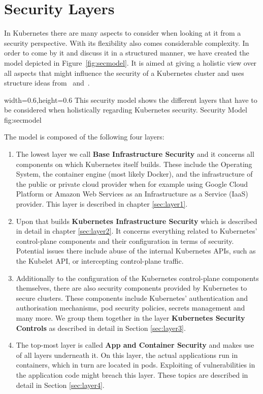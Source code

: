 \chapter{Security Layers}

In Kubernetes there are many aspects to consider when looking at it from a security perspective. With its flexibility also comes considerable complexity. In order to come by it and discuss it in a structured manner, we have created the model depicted in Figure~\ref{fig:secmodel}. It is aimed at giving a holistic view over all aspects that might influence the security of a Kubernetes cluster and uses structure ideas from~\textcite{securingkubernetes} and~\textcite{kubernetessecurity}.

  {width=0.6\textwidth,height=0.6\textheight}%
  {This security model shows the different layers that have to be considered when holistically regarding Kubernetes security.}%
  {Security Model}%
  {fig:secmodel}%

The model is composed of the following four layers:

\begin{enumerate}
    \item The lowest layer we call \textbf{Base Infrastructure Security} and it concerns all components on which Kubernetes itself builds. These include the Operating System, the container engine (most likely Docker), and the infrastructure of the public or private cloud provider when for example using Google Cloud Platform or Amazon Web Services as an Infrastructure as a Service (IaaS) provider. This layer is described in chapter \ref{sec:layer1}.
    \item Upon that builds \textbf{Kubernetes Infrastructure Security} which is described in detail in chapter \ref{sec:layer2}. It concerns everything related to Kubernetes' control-plane components and their configuration in terms of security. Potential issues there include abuse of the internal Kubernetes APIs, such as the Kubelet API, or intercepting control-plane traffic.
    \item Additionally to the configuration of the Kubernetes control-plane components themselves, there are also security components provided by Kubernetes to secure clusters. These components include Kubernetes' authentication and authorisation mechanisms, pod security policies, secrets management and many more. We group them together in the layer \textbf{Kubernetes Security Controls} as described in detail in Section \ref{sec:layer3}.
    \item The top-most layer is called \textbf{App and Container Security} and makes use of all layers underneath it. On this layer, the actual applications run in containers, which in turn are located in pods. Exploiting of vulnerabilities in the application code might breach this layer. These topics are described in detail in Section \ref{sec:layer4}.
\end{enumerate}

